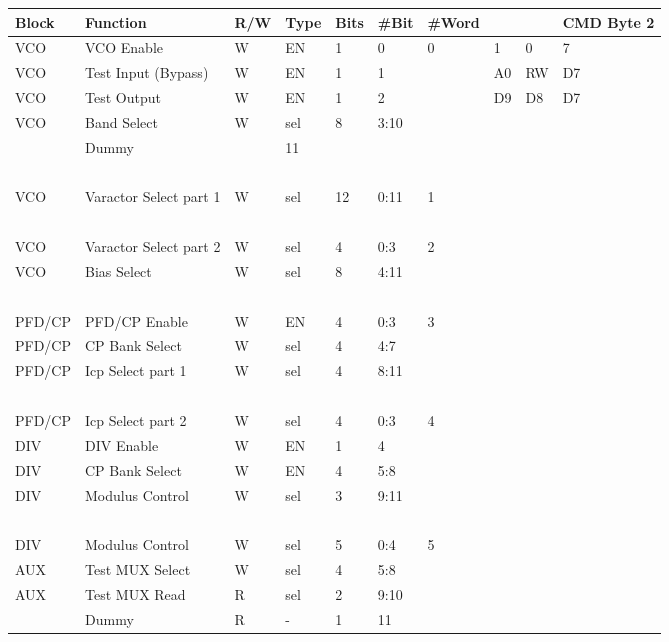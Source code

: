 \begin{table}[!ht]
    \centering
    \begin{tabular}{|l|l|l|l|l|l|l|l|l|l|}
    \hline
        Block & Function & R/W & Type & Bits & \#Bit & \#Word  & ~ & ~ & CMD Byte 2 \\ \hline
        VCO & VCO Enable & W & EN & 1 & 0 & 0 & 1 & 0 & 7 \\ \hline
        VCO & Test Input (Bypass) & W & EN & 1 & 1 & ~ & A0 & RW & D7 \\ \hline
        VCO & Test Output & W & EN & 1 & 2 & ~ & D9 & D8 & D7 \\ \hline
        VCO & Band Select & W & sel & 8 & 3:10 & ~ & ~ & ~ & ~ \\ \hline
        ~ & Dummy & ~ & 11 & ~ & ~ & ~ & ~ & ~ & ~ \\ \hline
        ~ & ~ & ~ & ~ & ~ & ~ & ~ & ~ & ~ & ~ \\ \hline
        VCO & Varactor Select part 1 & W & sel & 12 & 0:11 & 1 & ~ & ~ & ~ \\ \hline
        ~ & ~ & ~ & ~ & ~ & ~ & ~ & ~ & ~ & ~ \\ \hline
        VCO & Varactor Select part 2 & W & sel & 4 & 0:3 & 2 & ~ & ~ & ~ \\ \hline
        VCO & Bias Select & W & sel & 8 & 4:11 & ~ & ~ & ~ & ~ \\ \hline
        ~ & ~ & ~ & ~ & ~ & ~ & ~ & ~ & ~ & ~ \\ \hline
        PFD/CP & PFD/CP Enable & W & EN & 4 & 0:3 & 3 & ~ & ~ & ~ \\ \hline
        PFD/CP & CP Bank Select & W & sel & 4 & 4:7 & ~ & ~ & ~ & ~ \\ \hline
        PFD/CP & Icp Select part 1 & W & sel & 4 & 8:11 & ~ & ~ & ~ & ~ \\ \hline
        ~ & ~ & ~ & ~ & ~ & ~ & ~ & ~ & ~ & ~ \\ \hline
        PFD/CP & Icp Select part 2 & W & sel & 4 & 0:3 & 4 & ~ & ~ & ~ \\ \hline
        DIV & DIV Enable & W & EN & 1 & 4 & ~ & ~ & ~ & ~ \\ \hline
        DIV & CP Bank Select & W & EN & 4 & 5:8 & ~ & ~ & ~ & ~ \\ \hline
        DIV & Modulus Control & W & sel & 3 & 9:11 & ~ & ~ & ~ & ~ \\ \hline
        ~ & ~ & ~ & ~ & ~ & ~ & ~ & ~ & ~ & ~ \\ \hline
        DIV & Modulus Control & W & sel & 5 & 0:4 & 5 & ~ & ~ & ~ \\ \hline
        AUX & Test MUX Select & W & sel & 4 & 5:8 & ~ & ~ & ~ & ~ \\ \hline
        AUX & Test MUX Read & R & sel & 2 & 9:10 & ~ & ~ & ~ & ~ \\ \hline
        ~ & Dummy & R & - & 1 & 11 & ~ & ~ & ~ & ~ \\ \hline
    \end{tabular}
\end{table}

